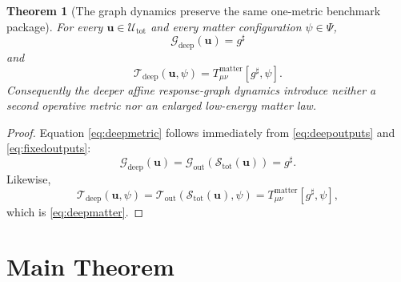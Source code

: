 \documentclass[11pt]{article}
\newcommand{\CompletedMetric}{g^{\sharp}}
\newcommand{\MetricOut}{\mathscr G_{\mathrm{out}}}
\newcommand{\MatterOut}{\mathscr T_{\mathrm{out}}}
\newcommand{\DeepMetricOut}{\mathscr G_{\mathrm{deep}}}
\newcommand{\DeepMatterOut}{\mathscr T_{\mathrm{deep}}}
\newcommand{\DeepShell}{\mathcal U_{\mathrm{tot}}}
\newcommand{\ChainSelectTriple}{\mathcal S_{\mathrm{tot}}}
\newtheorem{theorem}{Theorem}
\begin{document}
\begin{theorem}[The graph dynamics preserve the same one-metric benchmark package]
\label{thm:outputs}
For every \(\mathbf u\in\DeepShell\) and every matter configuration \(\psi\in\Psi\),
\begin{equation}
\DeepMetricOut(\mathbf u)=\CompletedMetric
\label{eq:deepmetric}
\end{equation}
and
\begin{equation}
\DeepMatterOut(\mathbf u,\psi)
=
T_{\mu\nu}^{\mathrm{matter}}[\CompletedMetric,\psi].
\label{eq:deepmatter}
\end{equation}
Consequently the deeper affine response-graph dynamics introduce neither a second operative metric nor an enlarged low-energy matter law.
\end{theorem}

\begin{proof}
Equation \eqref{eq:deepmetric} follows immediately from \eqref{eq:deepoutputs} and \eqref{eq:fixedoutputs}:
\[
\DeepMetricOut(\mathbf u)
=
\MetricOut(\ChainSelectTriple(\mathbf u))
=
\CompletedMetric.
\]
Likewise,
\[
\DeepMatterOut(\mathbf u,\psi)
=
\MatterOut(\ChainSelectTriple(\mathbf u),\psi)
=
T_{\mu\nu}^{\mathrm{matter}}[\CompletedMetric,\psi],
\]
which is \eqref{eq:deepmatter}.
\end{proof}

\section{Main Theorem}
\end{document}
